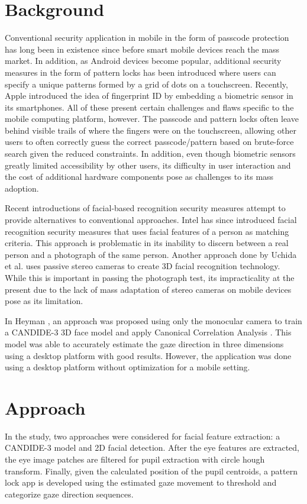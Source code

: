 \documentclass[10pt,twocolumn,letterpaper]{article}
\begin{document}
\section{Background}
Conventional security application in mobile in the form of passcode protection has long been in existence since before smart mobile devices reach the mass market.  In addition, as Android devices become popular, additional security measures in the form of pattern locks has been introduced where users can specify a unique patterns formed by a grid of dots on a touchscreen.  Recently, Apple introduced the idea of fingerprint ID by embedding a biometric sensor in its smartphones.  All of these present certain challenges and flaws specific to the mobile computing platform, however.  The passcode and pattern locks often leave behind visible trails of where the fingers were on the touchscreen, allowing other users to often correctly guess the correct passcode/pattern based on brute-force search given the reduced constraints.  In addition, even though biometric sensors greatly limited accessibility by other users, its difficulty in user interaction and the cost of additional hardware components pose as challenges to its mass adoption.

Recent introductions of facial-based recognition security measures attempt to provide alternatives to conventional approaches.  Intel has since introduced facial recognition security measures that uses facial features of a person as matching criteria.  This approach is problematic in its inability to discern between a real person and a photograph of the same person.  Another approach done by Uchida et al. \cite{3dface} uses passive stereo cameras to create 3D facial recognition technology.  While this is important in passing the photograph test, its impracticality at the present due to the lack of mass adaptation of stereo cameras on mobile devices pose as its limitation. 

In Heyman \cite{heyman}, an approach was proposed using only the monocular camera to train a CANDIDE-3 3D face model and apply Canonical Correlation Analysis \cite{candide}.  This model was able to accurately estimate the gaze direction in three dimensions using a desktop platform with good results.  However, the application was done using a desktop platform without optimization for a mobile setting.

\section{Approach}
In the study, two approaches were considered for facial feature extraction: a CANDIDE-3 model and 2D facial detection.  After the eye features are extracted, the eye image patches are filtered for pupil extraction with circle hough transform.  Finally, given the calculated position of the pupil centroids, a pattern lock app is developed using the estimated gaze movement to threshold and categorize gaze direction sequences.
\end{document}
